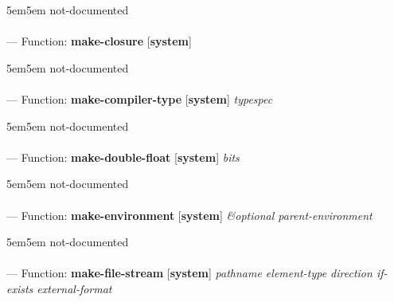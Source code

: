 \begin{adjustwidth}{5em}{5em}
not-documented
\end{adjustwidth}

\paragraph{}
\label{SYSTEM:MAKE-CLOSURE}
--- Function: \textbf{make-closure} [\textbf{system}] \textit{}

\begin{adjustwidth}{5em}{5em}
not-documented
\end{adjustwidth}

\paragraph{}
\label{SYSTEM:MAKE-COMPILER-TYPE}
--- Function: \textbf{make-compiler-type} [\textbf{system}] \textit{typespec}

\begin{adjustwidth}{5em}{5em}
not-documented
\end{adjustwidth}

\paragraph{}
\label{SYSTEM:MAKE-DOUBLE-FLOAT}
--- Function: \textbf{make-double-float} [\textbf{system}] \textit{bits}

\begin{adjustwidth}{5em}{5em}
not-documented
\end{adjustwidth}

\paragraph{}
\label{SYSTEM:MAKE-ENVIRONMENT}
--- Function: \textbf{make-environment} [\textbf{system}] \textit{\&optional parent-environment}

\begin{adjustwidth}{5em}{5em}
not-documented
\end{adjustwidth}

\paragraph{}
\label{SYSTEM:MAKE-FILE-STREAM}
--- Function: \textbf{make-file-stream} [\textbf{system}] \textit{pathname element-type direction if-exists external-format}

